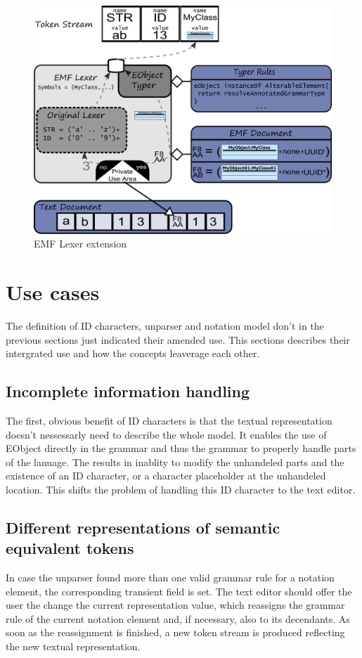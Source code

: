\begin{figure}
\centering
\includegraphics[scale=0.55]{gfx/ex/Lexer} 
\caption{EMF Lexer extension}
\end{figure}


\section{Use cases}
The definition of ID characters, unparser and notation model don't in the previous sections just indicated their amended use. This sections describes their intergrated use and how the concepts leaverage each other. 

\subsection{Incomplete information handling}
The first, obvious benefit of ID characters is that the textual representation doesn't nessessarly need to describe the whole model. It enables the use of EObject directly in the grammar and thus the grammar to properly handle parts of the lanuage. The results in inablity to modify the unhandeled parts and the existence of an ID character, or a character placeholder at the unhandeled location. This shifts the problem of handling this ID character to the text editor.

\subsection{Different representations of semantic equivalent tokens}
In case the unparser found more than one valid grammar rule for a notation element, the corresponding transient field is set. The text editor should offer the user the change the current representation value, which reassigns the grammar rule of the current notation element and, if necessary, also to its decendants. As soon as the reassignment is finished, a new token stream is produced reflecting the new textual representation.


